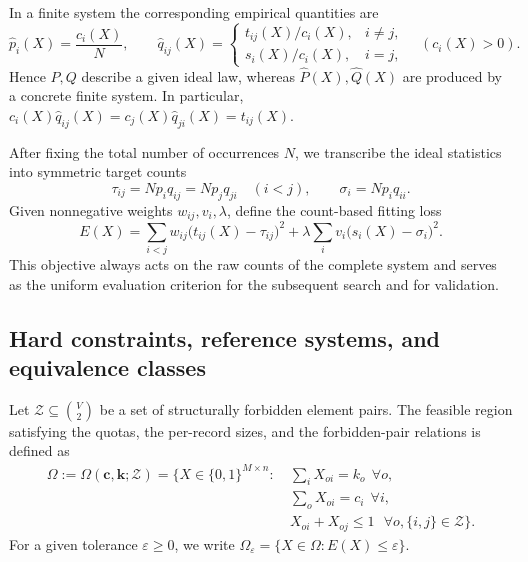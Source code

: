 \documentclass[11pt,a4paper]{article}
\numberwithin{equation}{section}
\theoremstyle{definition}
\numberwithin{algorithm}{section}
\begin{document}
In a finite system the corresponding empirical quantities are
\begin{equation}
\widehat p_i(X)=\frac{c_i(X)}{N},\qquad
\widehat q_{ij}(X)=
\begin{cases}
t_{ij}(X)/c_i(X),&i\ne j,\\
s_i(X)/c_i(X),&i=j,
\end{cases}\quad(c_i(X)>0).
\label{eq:empirical-statistics}
\end{equation}
Hence $P,Q$ describe a given ideal law, whereas
$\widehat P(X),\widehat Q(X)$ are produced by a concrete finite system.
In particular,
$c_i(X)\widehat q_{ij}(X)=c_j(X)\widehat q_{ji}(X)=t_{ij}(X)$.

After fixing the total number of occurrences $N$, we transcribe the ideal statistics
into symmetric target counts
\begin{equation}
\tau_{ij}=Np_iq_{ij}=Np_jq_{ji}\quad(i<j),\qquad
\sigma_i=Np_iq_{ii}.
\label{eq:count-targets}
\end{equation}
Given nonnegative weights $w_{ij},v_i,\lambda$, define the count-based fitting loss
\begin{equation}
E(X)=\sum_{i<j}w_{ij}\bigl(t_{ij}(X)-\tau_{ij}\bigr)^2+
\lambda\sum_i v_i\bigl(s_i(X)-\sigma_i\bigr)^2.
\label{eq:global-loss}
\end{equation}
This objective always acts on the raw counts of the complete system and serves as the
uniform evaluation criterion for the subsequent search and for validation.

\subsection{Hard constraints, reference systems, and equivalence classes}\label{subsec:model-feasible}

Let $\mathcal Z\subseteq\binom V2$ be a set of structurally forbidden element pairs.
The feasible region satisfying the quotas, the per-record sizes, and the forbidden-pair
relations is defined as
\begin{equation}
\begin{aligned}
\Omega:=\Omega(\boldsymbol c,\boldsymbol k;\mathcal Z)
=\bigl\{X\in\{0,1\}^{M\times n}:&
\ \sum_iX_{oi}=k_o\ \ \forall o,\\
&\ \sum_oX_{oi}=c_i\ \ \forall i,\\
&\ X_{oi}+X_{oj}\le 1\
\ \ \forall o,\{i,j\}\in\mathcal Z\bigr\}.
\end{aligned}
\label{eq:omega}
\end{equation}
For a given tolerance $\varepsilon\ge0$, we write
$\Omega_\varepsilon=\{X\in\Omega:E(X)\le\varepsilon\}$.
\end{document}
